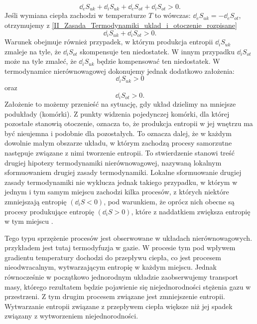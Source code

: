 \documentclass[10pt, a4paper, twoside, onecolumn]{article}
\numberwithin{equation}{section}
\begin{document}
	
	\begin{equation}\label{II_Zasada_Termodynamiki_uklad_i_otoczenie_rozpisane}
		\dd_{e}S_{uk}+\dd_{i}S_{uk}+\dd_{e}S_{ot}+\dd_{i}S_{ot}>0.
	\end{equation}
	Jeśli wymiana ciepła zachodzi w temperaturze \(T\) to wówczas: \(\dd_{e}S_{uk}=-\dd_{e}S_{ot}\), otrzymujemy z \eqref{II_Zasada_Termodynamiki_uklad_i_otoczenie_rozpisane} 
	\begin{equation}\label{}
		\dd_{i}S_{uk}+\dd_{i}S_{ot}>0.
	\end{equation}
	Warunek obejmuje również przypadek, w którym produkcja entropii \(\dd_{i}S_{uk}\) zmaleje na tyle, że \(\dd_{i}S_{ot}\) skompensuje ten niedostatek. W innym przypadku \(\dd_{i}S_{ot}\) może na tyle zmaleć, że \(\dd_{i}S_{uk}\) będzie kompensować ten niedostatek. W termodynamice nierównowagowej dokonujemy jednak dodatkowo założenia:
	\begin{equation*}
		\dd_{i}S_{uk}>0
	\end{equation*}
	oraz
	\begin{equation*}
		\dd_{i}S_{ot}>0.
	\end{equation*}
	Założenie to możemy przenieść na sytuację, gdy układ dzielimy na mniejsze podukłady (komórki). Z punkty widzenia pojedynczej komórki, dla której pozostałe stanowią otoczenie, oznacza to, że produkcja entropii w jej wnętrzu ma być nieujemna i podobnie dla pozostałych. To oznacza dalej, że w każdym dowolnie małym obszarze układu, w którym zachodzą procesy samorzutne następuje związane z nimi tworzenie entropii. To stwierdzenie stanowi treść drugiej hipotezy termodynamiki nierównowagowej, nazywaną lokalnym sformuowaniem drugiej zasady termodynamiki. Lokalne sformuowanie drugiej zasady termodynamiki nie wyklucza jednak takiego przypadku, w którym w jednym i tym samym miejscu zachodzi kilka procesów, z których niektóre zmniejszają entropię \((\dd_{i}S<0)\), pod warunkiem, że oprócz nich obecne są procesy produkujące entropię \((\dd_{i}S>0)\), które z naddatkiem zwiększa entropię w tym miejscu \cite{orlik, pigon1}. \par
	Tego typu sprzężenie procesów jest obserwowane w układach nierównowagowych. przykładem jest tutaj termodyfuzja w gazie. W procesie tym pod wpływem gradientu temperatury dochodzi do przepływu ciepła, co jest procesem nieodwracalnym, wytwarzającym entropię w każdym miejscu. Jednak równocześnie w początkowo jednorodnym układzie zaobserwujemy transport masy, którego rezultatem będzie pojawienie się niejednorodności stężenia gazu w przestrzeni. Z tym drugim procesem związane jest zmniejszenie entropii. Wytwarzanie entropii związane z przepływem ciepła większe niż jej spadek związany z wytworzeniem niejednorodności. 
	
\end{document}

